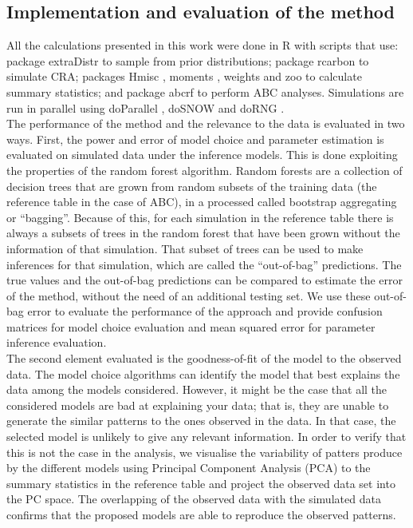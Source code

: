 \documentclass[a4paper]{article}
\begin{document}
\subsection*{Implementation and evaluation of the method}

All the calculations presented in this work were done in R \parencite{R2021} with scripts \parencite[available in][]{Navascues2023} that use: package {extraDistr} \parencite{Wolodzko2020} to sample from prior distributions; package {rcarbon} \parencite{Crema2021a} to simulate CRA; packages {Hmisc} \parencite{Harrell2022}, {moments} \parencite{Komsta2022}, {weights} \parencite{Pasek2021} and {zoo} \parencite{Zeileis2005} to calculate summary statistics; and package {abcrf} \parencite{Marin2022} to perform ABC analyses. Simulations are run in parallel using  {doParallel} \parencite{Microsoft2022a}, {doSNOW} \parencite{Microsoft2022b} and {doRNG} \parencite{Gaujoux2023}.
\\

The performance of the method and the relevance to the data is evaluated in two ways. First, the power and error of model choice and parameter estimation is evaluated on simulated data under the inference models. This is done exploiting the properties of the random forest algorithm. Random forests are a collection of decision trees that are grown from random subsets of the training data (the reference table in the case of ABC), in a processed called bootstrap aggregating or ``bagging''. Because of this, for each simulation in the reference table there is always a subsets of trees in the random forest that have been grown without the information of that simulation. That subset of trees can be used to make inferences for that simulation, which are called the ``out-of-bag'' predictions. The true values and the out-of-bag predictions can be compared to estimate the error of the method, without the need of an additional testing set. We use these out-of-bag error to evaluate the performance of the approach and provide confusion matrices for model choice evaluation and mean squared error for parameter inference evaluation.
\\

The second element evaluated is the goodness-of-fit of the model to the observed data. The model choice algorithms can identify the model that best explains the data among the models considered. However, it might be the case that all the considered models are bad at explaining your data; that is, they are unable to generate the similar patterns to the ones observed in the data. In that case, the selected model is unlikely to give any relevant information. In order to verify that this is not the case in the analysis, we visualise the variability of patters produce by the different models using Principal Component Analysis (PCA) to the summary statistics in the reference table and project the observed data set into the PC space. The overlapping of the observed data with the simulated data confirms that the proposed models are able to reproduce the observed patterns.
\\
\end{document}
